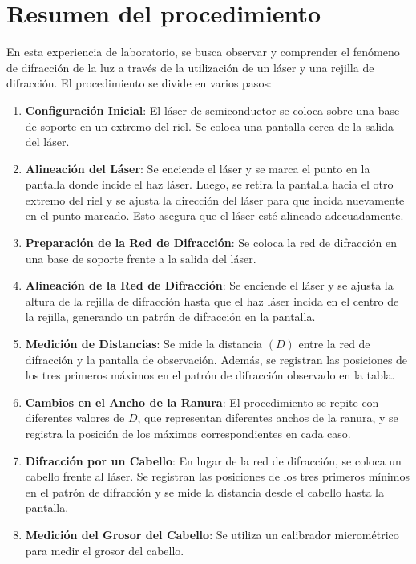 \documentclass[twocolumn, 12pt]{article}
\begin{document}
\nocite{Diffractiongrating}

\section{Resumen del procedimiento}

En esta experiencia de laboratorio, se busca observar y
comprender el fenómeno de difracción de la luz a través de
la utilización de un láser y una rejilla de difracción. El
procedimiento se divide en varios pasos:

\begin{enumerate}
    \item \textbf{Configuración Inicial}: El láser de semiconductor se coloca
          sobre una base de soporte en un extremo del riel. Se coloca
          una pantalla cerca de la salida del láser.

    \item \textbf{Alineación del Láser}: Se enciende el láser y se marca el
          punto en la pantalla donde incide el haz láser. Luego, se
          retira la pantalla hacia el otro extremo del riel y se
          ajusta la dirección del láser para que incida nuevamente en
          el punto marcado. Esto asegura que el láser esté alineado
          adecuadamente.

    \item \textbf{Preparación de la Red de Difracción}: Se coloca la red de
          difracción en una base de soporte frente a la salida del
          láser.

    \item \textbf{Alineación de la Red de Difracción}: Se enciende el láser y
          se ajusta la altura de la rejilla de difracción hasta que
          el haz láser incida en el centro de la rejilla, generando
          un patrón de difracción en la pantalla.

    \item \textbf{Medición de Distancias}: Se mide la distancia $(D)$ entre la
          red de difracción y la pantalla de observación. Además, se
          registran las posiciones de los tres primeros máximos en el
          patrón de difracción observado en la tabla.

    \item \textbf{Cambios en el Ancho de la Ranura}: El procedimiento se
          repite con diferentes valores de $D$, que representan
          diferentes anchos de la ranura, y se registra la posición
          de los máximos correspondientes en cada caso.

    \item \textbf{Difracción por un Cabello}: En lugar de la red de
          difracción, se coloca un cabello frente al láser. Se
          registran las posiciones de los tres primeros mínimos en el
          patrón de difracción y se mide la distancia desde el
          cabello hasta la pantalla.

    \item \textbf{Medición del Grosor del Cabello}: Se utiliza un calibrador
          micrométrico para medir el grosor del cabello.
\end{enumerate}
\end{document}
